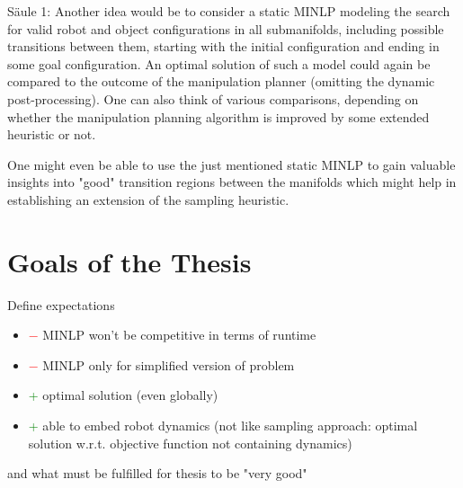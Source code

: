 \documentclass{article}
\begin{document}
S\"aule 1: Another idea would be to consider a static MINLP modeling the search for valid robot and object configurations in all submanifolds, including possible transitions between them, starting with the initial configuration and ending in some  goal configuration. An optimal solution of such a model could again be compared to the outcome of the manipulation planner (omitting the dynamic post-processing). One can also think of various comparisons, depending on whether the manipulation planning algorithm is improved by some extended heuristic or not.

One might even be able to use the just mentioned static MINLP to gain valuable insights into "good" transition regions between the manifolds which might help in establishing an extension of the sampling heuristic.

\section{Goals of the Thesis}
Define expectations 
\begin{itemize}[label={}]
	\item \textcolor{red}{$-$} MINLP won't be competitive in terms of runtime
	\item \textcolor{red}{$-$} MINLP only for simplified version of problem
	\item \textcolor{green}{+} optimal solution (even globally)
	\item \textcolor{green}{+} able to embed robot dynamics (not like sampling approach: optimal solution w.r.t. objective function not containing dynamics)
\end{itemize}
and what must be fulfilled for thesis to be "very good"

{}

\end{document}
